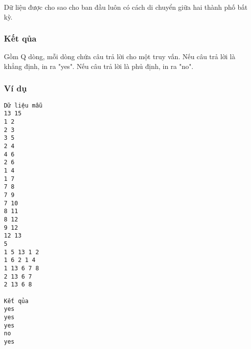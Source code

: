    Dữ liệu được cho sao cho ban đầu luôn có cách di chuyển giữa hai thành phố bất kỳ.  

\subsubsection{   Kết qủa  }

   Gồm Q dòng, mỗi dòng chứa câu trả lời cho một truy vấn. Nếu câu trả lời là khẳng định, in ra "yes". Nếu câu trả lời là phủ định, in ra "no".  

\subsubsection{   Ví dụ  }
\begin{verbatim}
Dữ liệu mẫu
13 15
1 2
2 3
3 5
2 4
4 6
2 6
1 4
1 7
7 8
7 9
7 10
8 11
8 12
9 12
12 13
5
1 5 13 1 2
1 6 2 1 4
1 13 6 7 8
2 13 6 7
2 13 6 8

Kết qủa
yes
yes
yes
no
yes
\end{verbatim}
